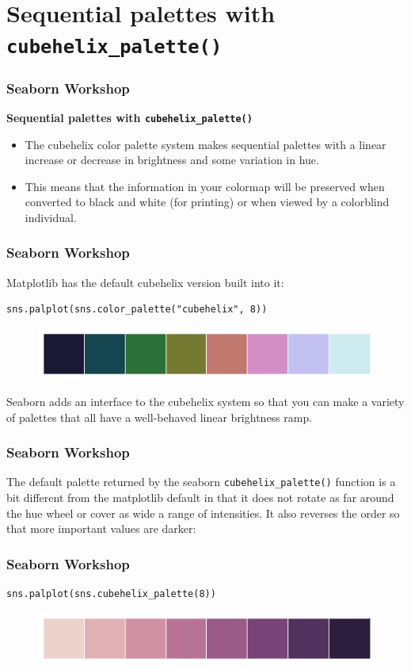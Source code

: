 \documentclass{beamer}
\begin{document}
\section{Sequential palettes with \texttt{cubehelix\_palette()}}
\begin{frame}[fragile]
	\frametitle{Seaborn Workshop}
	\large
\noindent \textbf{Sequential palettes with \texttt{cubehelix\_palette()}}
\begin{itemize}
\item The cubehelix color palette system makes sequential palettes with a linear increase or decrease in brightness and some variation in hue. 
\item This means that the information in your colormap will be preserved when converted to black and white (for printing) or when viewed by a colorblind individual.
\end{itemize}

\end{frame}
\begin{frame}[fragile]
\frametitle{Seaborn Workshop}
\large

Matplotlib has the default cubehelix version built into it:
\begin{verbatim}
sns.palplot(sns.color_palette("cubehelix", 8))
\end{verbatim}

\begin{figure}
	\centering
	\includegraphics[width=0.7\linewidth]{images/color_palettes_32_0}
\end{figure}
Seaborn adds an interface to the cubehelix system so that you can make a variety of palettes that all have a well-behaved linear brightness ramp.
\end{frame}
\begin{frame}[fragile]
	\frametitle{Seaborn Workshop}
	\large
The default palette returned by the seaborn \texttt{cubehelix\_palette()} function is a bit different from the matplotlib default in that it does not rotate as far around the hue wheel or cover as wide a range of intensities. It also reverses the order so that more important values are darker:
\end{frame}
\begin{frame}[fragile]
	\frametitle{Seaborn Workshop}
	\large
	\begin{verbatim}
sns.palplot(sns.cubehelix_palette(8))
	\end{verbatim}

\begin{figure}
\centering
\includegraphics[width=0.7\linewidth]{images/color_palettes_34_0}
\end{figure}

\end{frame}
\end{document}
